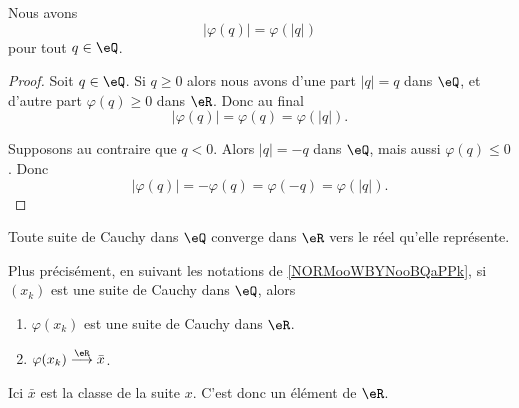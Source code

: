 \begin{lemma}       \label{LEMooXCVRooOSZYWv}
	Nous avons
	\begin{equation}
		| \varphi(q) |= \varphi(| q |)
	\end{equation}
	pour tout \( q\in \eQ\).
\end{lemma}

\begin{proof}
	Soit \( q\in \eQ\). Si \( q\geq 0\) alors nous avons d'une part \( | q |=q\) dans \( \eQ\), et d'autre part \( \varphi(q)\geq 0\) dans \( \eR\). Donc au final
	\begin{equation}
		| \varphi(q) |=\varphi(q)=\varphi(| q |).
	\end{equation}

	Supposons au contraire que \( q<0\). Alors \( | q |=-q\) dans \( \eQ\), mais aussi \( \varphi(q)\leq 0\). Donc
	\begin{equation}
		| \varphi(q) |=-\varphi(q)=\varphi(-q)=\varphi(| q |).
	\end{equation}
\end{proof}

\begin{lemma}      \label{LemooRTGFooYVstwS}
	Toute suite de Cauchy dans \( \eQ\) converge dans \( \eR\) vers le réel qu'elle représente.

	Plus précisément, en suivant les notations de \ref{NORMooWBYNooBQaPPk}, si \( (x_k)\) est une suite de Cauchy dans \( \eQ\), alors
	\begin{enumerate}
		\item
		      \( \varphi(x_k)\) est une suite de Cauchy dans \( \eR\).
		\item
		      \( \varphi(x_k)\stackrel{\eR}{\longrightarrow}\bar x\).
	\end{enumerate}
	Ici \( \bar x\) est la classe de la suite \( x\). C'est donc un élément de \( \eR\).
\end{lemma}

